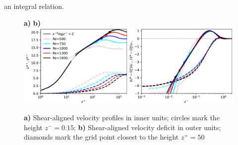 \documentclass[smallcondensed,final]{svjour3}
\begin{document}
an integral relation. 
%
\par
%
\begin{figure}
  \begin{flushleft}
    \textbf{a)}\hspace{0.47\textwidth} \textbf{b)}\\
    \includegraphics[width=\textwidth]{../plot/uv_innerouter.pdf}\\
    \caption{
      \textbf{a)} Shear-aligned velocity profiles in inner units; circles mark the
      height $z^-=0.15$;
      \textbf{b)} Shear-aligned velocity deficit in outer units; diamonds mark the grid point closest to the height $z^+=50$
      \label{fig:profiles}
    }
  \end{flushleft}
\end{figure}
\end{document}
